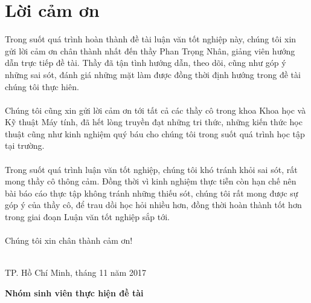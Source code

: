 \documentclass[a4paper]{article}
\begin{document}
\section*{Lời cảm ơn}
Trong suốt quá trình hoàn thành đề tài luận văn tốt nghiệp này, chúng tôi xin gửi lời cảm ơn chân thành nhất đến thầy   Phan Trọng Nhân, giảng viên hướng dẫn trực tiếp đề tài. Thầy đã tận tình hướng dẫn, theo dõi, cũng như góp ý những sai sót, đánh  giá những mặt làm được đồng thời định hướng trong đề tài chúng tôi thực hiên.\\
\\
Chúng tôi cũng xin gửi lời cảm ơn tới tất cả các thầy cô trong khoa Khoa học và Kỹ thuật Máy tính, đã hết lòng truyền đạt những tri thức, những kiến thức học thuật cũng như kinh nghiệm quý báu cho chúng tôi trong suốt quá trình học tập tại trường.\\
\\
Trong suốt quá trình luận văn tốt nghiệp, chúng tôi khó tránh khỏi sai sót, rất mong thầy cô thông cảm. Đồng thời vì kinh nghiệm thực tiễn còn hạn chế nên bài báo cáo thực tập không tránh những thiếu sót, chúng tôi rất mong được sự góp ý của thầy cô, để trau dồi học hỏi nhiều hơn, đồng thời hoàn thành tốt hơn trong giai đoạn Luận văn tốt nghiệp sắp tới.\\
\\
Chúng tôi xin chân thành cảm ơn!\\
\\
\begin{flushright}
    TP. Hồ Chí Minh, tháng 11 năm 2017 \\
                  
\end{flushright}
\begin{flushright}
    \textbf{Nhóm sinh viên thực hiện đề tài}
\end{flushright}

\newpage
\tableofcontents
\newpage
\listoffigures
\newpage
\listoftables
\newpage
\end{document}
